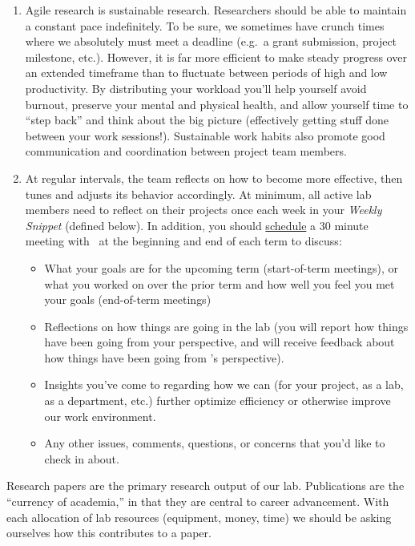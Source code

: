 \documentclass{tufte-book} %
\begin{document}
\begin{enumerate}
\item Agile research is sustainable research.  Researchers should be
  able to maintain a constant pace indefinitely.  To be sure, we
  sometimes have crunch times where we absolutely must meet a deadline
  (e.g.\ a grant submission, project milestone, etc.).  However, it is
  far more efficient to make steady progress over an extended
  timeframe than to fluctuate between periods of high and low productivity.
  By distributing your workload you'll help yourself avoid burnout,
  preserve your mental and physical health, and allow yourself time to
  ``step back'' and think about the big picture (effectively getting
  stuff done between your work sessions!).  Sustainable work habits
  also promote good communication and coordination between project
  team members.

\item At regular intervals, the team reflects on how to become more
  effective, then tunes and adjusts its behavior accordingly.  At
  minimum, all active lab members need to reflect on their projects
  once each week in your \textit{Weekly Snippet} (defined below).  In
  addition, you should
  \href{https://context-lab.youcanbook.me/}{schedule} a 30 minute
  meeting with \director~at the beginning and end of each term to
  discuss:
  \begin{itemize}
  \item What your goals are for the upcoming term (start-of-term
    meetings), or what you worked on over the prior term and how
    well you feel you met your goals (end-of-term meetings)
  \item Reflections on how things are going in the lab (you will
    report how things have been going from your perspective, and will
    receive feedback about how things have been going from \director's
    perspective).
  \item Insights you've come to regarding how we can (for your
    project, as a lab, as a department, etc.) further optimize
    efficiency or otherwise improve our work environment.
  \item Any other issues, comments, questions, or concerns that you'd
    like to check in about.
  \end{itemize}
\end{enumerate}


\noindent Research papers are the primary research output of our lab.
Publications are the ``currency of academia,'' in that they are
central to career advancement.  With each allocation of lab resources
(equipment, money, time) we should be asking ourselves how this
contributes to a paper.
\end{document}
